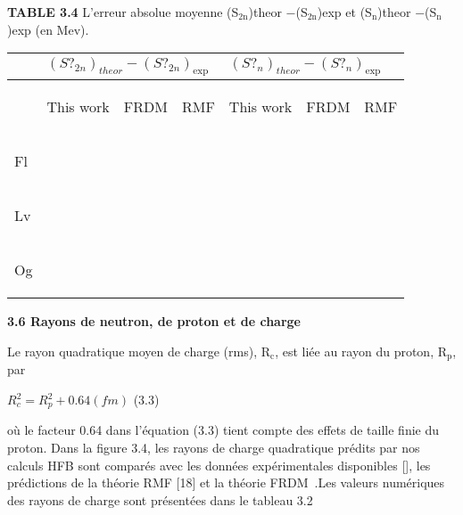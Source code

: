 \documentclass[a4paper]{article}
\providecommand\textsubscript[1]{\ensuremath{{}_{\text{#1}}}}
\begin{document}
\textbf{TABLE 3.4} L’erreur absolue moyenne (S\textit{\textsubscript{2n}})theor −(S\textit{\textsubscript{2n}})exp et (S\textit{\textsubscript{n}})theor −(S\textit{\textsubscript{n}})exp (en Mev).

\begin{center}
\tablefirsthead{}
\tablehead{}
\tabletail{}
\tablelasttail{}
\begin{supertabular}{|m{0.84275985in}|m{0.8420598in}|m{0.84275985in}|m{0.84275985in}|m{0.84275985in}|m{0.84275985in}|m{0.8420598in}|}
\hline
 &
 &
\\\hline
 &
{\begin{french} This work\end{french}} &
{\begin{french} FRDM\end{french}} &
{\begin{french} RMF\end{french}} &
{\begin{french} This work\end{french}} &
{\begin{french} FRDM\end{french}} &
{\begin{french} RMF\end{french}}\\\hline
{\begin{french} Fl\end{french}} &
 &
 &
 &
 &
 &
\\\hline
{\begin{french} Lv\end{french}} &
 &
 &
 &
 &
 &
\\\hline
{\begin{french} Og\end{french}} &
 &
 &
 &
 &
 &
\\\hline
\end{supertabular}
\end{center}
\textbf{3.6 Rayons de neutron, de proton et de charge  \ \ }

 Le rayon quadratique moyen de charge (rms), R\textit{\textsubscript{c}}, est liée au rayon du proton, R\textit{\textsubscript{p}}, par

  $R_c^2=R_p^2+0.64(\mathit{fm})$ (3.3)

où le facteur 0.64 dans l’équation (3.3) tient compte des effets de taille finie du proton. Dans la figure 3.4, les rayons de charge quadratique prédits par nos calculs HFB sont comparés avec les données expérimentales disponibles [], les prédictions de la théorie RMF [18] et la théorie FRDM~.Les valeurs numériques des rayons de charge sont présentées dans le tableau 3.2
\end{document}
